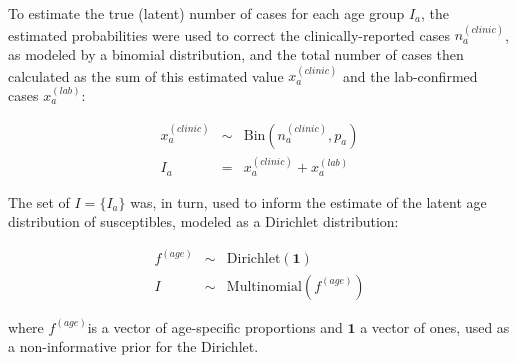 To estimate the true (latent) number of cases for each age group \(I_a\), the estimated probabilities were used to correct the clinically-reported cases \(n_a^{(clinic)}\), as modeled by a binomial distribution, and the total number of cases then calculated as the sum of this estimated value \(x_a^{(clinic)}\) and the lab-confirmed cases \(x_a^{(lab)}\):

\begin{eqnarray}
x_a^{(clinic)} &\sim& \text{Bin}(n_a^{(clinic)},p_a) \\
I_a &=& x_a^{(clinic)}+x_a^{(lab)}
\end{eqnarray}

The set of \(I = \{I_a\}\) was, in turn, used to inform the estimate of the latent age distribution of susceptibles, modeled as a Dirichlet distribution:

\begin{eqnarray}
f^{(age)} &\sim& \text{Dirichlet}(\mathbf{1}) \\
I &\sim& \text{Multinomial}(f^{(age)})
\end{eqnarray}

where \(f^{(age)}\)is a vector of age-specific proportions and \(\mathbf{1}\) a vector of ones, used as a non-informative prior for the Dirichlet.